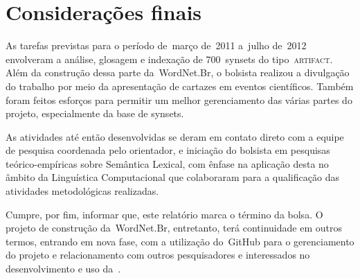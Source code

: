 \chapter{Considerações finais}

% 
% 

As tarefas previstas para o período de~março de~2011 a~julho de~2012 envolveram
a análise, glosagem e indexação de 700~synsets do tipo~\textsc{artifact}. Além
da construção dessa parte da~WordNet.Br, o bolsista realizou a divulgação do
trabalho por meio da apresentação de cartazes em eventos científicos. Também
foram feitos esforços para permitir um melhor gerenciamento das várias partes
do projeto, especialmente da base de synsets.

As atividades até então desenvolvidas se deram em contato direto com a equipe
de pesquisa coordenada pelo orientador, e iniciação do bolsista em pesquisas
teórico-empíricas sobre Semântica Lexical, com ênfase na aplicação desta no
âmbito da Linguística Computacional que colaboraram para a qualificação das
atividades metodológicas realizadas.

Cumpre, por fim, informar que, este relatório marca o término da bolsa. O
projeto de construção da~WordNet.Br, entretanto, terá continuidade em outros
termos, entrando em nova fase, com a utilização do~GitHub para o gerenciamento
do projeto e relacionamento com outros pesquisadores e interessados no
 desenvolvimento e uso da~\wnbr.
